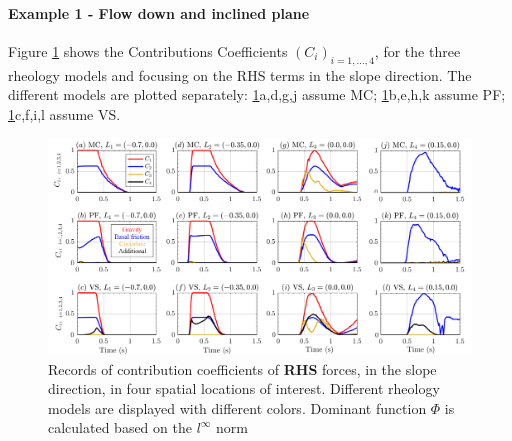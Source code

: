\documentclass{article}
\begin{document}
\newpage
\paragraph{Example 1 - Flow down and inclined plane}
Figure \ref{fig:Ramp-Ci_x} shows the Contributions Coefficients $(C_i)_{i=1,\dots,4}$, for the three rheology models and focusing on the RHS terms in the slope direction. The different models are plotted separately: \ref{fig:Ramp-Ci_x}a,d,g,j assume MC; \ref{fig:Ramp-Ci_x}b,e,h,k assume PF; \ref{fig:Ramp-Ci_x}c,f,i,l assume VS.
\begin{figure}[H]
         \centering
        \includegraphics[width=1\textwidth]{InclinedPlane/ForceContrib/Ci_x.png}
        \caption{Records of contribution coefficients of \textbf{RHS} forces, in the slope direction, in four spatial locations of interest. Different rheology models are displayed with different colors. Dominant function $\Phi$ is calculated based on the $l^\infty$ norm}
        \label{fig:Ramp-Ci_x}
\end{figure}
\end{document}
